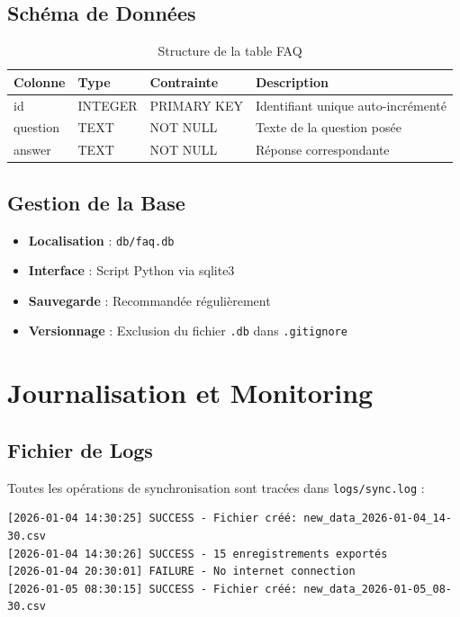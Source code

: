 \documentclass[11pt,a4paper]{article}
\begin{document}
\subsection{Schéma de Données}
\begin{table}[H]
    \centering
    \begin{tabularx}{\textwidth}{|X|X|X|X|}
        \hline
        \textbf{Colonne} & \textbf{Type} & \textbf{Contrainte} & \textbf{Description} \\
        \hline
        id & INTEGER & PRIMARY KEY & Identifiant unique auto-incrémenté \\
        \hline
        question & TEXT & NOT NULL & Texte de la question posée \\
        \hline
        answer & TEXT & NOT NULL & Réponse correspondante \\
        \hline
    \end{tabularx}
    \caption{Structure de la table FAQ}
\end{table}

\subsection{Gestion de la Base}
\begin{itemize}
    \item \textbf{Localisation} : \texttt{db/faq.db}
    \item \textbf{Interface} : Script Python via sqlite3
    \item \textbf{Sauvegarde} : Recommandée régulièrement
    \item \textbf{Versionnage} : Exclusion du fichier \texttt{.db} dans \texttt{.gitignore}
\end{itemize}

\section{Journalisation et Monitoring}
\label{sec:logging}

\subsection{Fichier de Logs}
Toutes les opérations de synchronisation sont tracées dans \texttt{logs/sync.log} :

\begin{lstlisting}
[2026-01-04 14:30:25] SUCCESS - Fichier créé: new_data_2026-01-04_14-30.csv
[2026-01-04 14:30:26] SUCCESS - 15 enregistrements exportés
[2026-01-04 20:30:01] FAILURE - No internet connection
[2026-01-05 08:30:15] SUCCESS - Fichier créé: new_data_2026-01-05_08-30.csv
\end{lstlisting}
\end{document}
